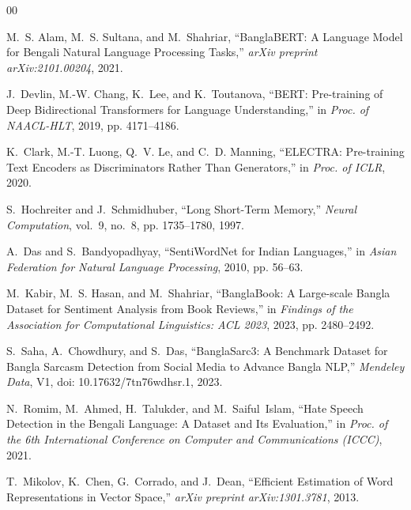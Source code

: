 \documentclass[11pt,a4paper]{article}
\begin{document}
\begin{thebibliography}{00}

M.~S. Alam, M.~S. Sultana, and M.~Shahriar,
``BanglaBERT: A Language Model for Bengali Natural Language Processing Tasks,''
\emph{arXiv preprint arXiv:2101.00204}, 2021.

J.~Devlin, M.-W. Chang, K.~Lee, and K.~Toutanova,
``BERT: Pre-training of Deep Bidirectional Transformers for Language Understanding,''
in \emph{Proc. of NAACL-HLT}, 2019, pp. 4171--4186.

K.~Clark, M.-T. Luong, Q.~V. Le, and C.~D. Manning,
``ELECTRA: Pre-training Text Encoders as Discriminators Rather Than Generators,''
in \emph{Proc. of ICLR}, 2020.

S.~Hochreiter and J.~Schmidhuber,
``Long Short-Term Memory,''
\emph{Neural Computation}, vol.~9, no.~8, pp. 1735--1780, 1997.

A.~Das and S.~Bandyopadhyay,
``SentiWordNet for Indian Languages,''
in \emph{Asian Federation for Natural Language Processing}, 2010, pp. 56--63.

M.~Kabir, M.~S. Hasan, and M.~Shahriar,
``BanglaBook: A Large-scale Bangla Dataset for Sentiment Analysis from Book Reviews,''
in \emph{Findings of the Association for Computational Linguistics: ACL 2023}, 2023, pp. 2480--2492.

S.~Saha, A.~Chowdhury, and S.~Das,
``BanglaSarc3: A Benchmark Dataset for Bangla Sarcasm Detection from Social Media to Advance Bangla NLP,''
\emph{Mendeley Data}, V1, doi: 10.17632/7tn76wdhsr.1, 2023.

N.~Romim, M.~Ahmed, H.~Talukder, and M.~Saiful~Islam,
``Hate Speech Detection in the Bengali Language: A Dataset and Its Evaluation,''
in \emph{Proc. of the 6th International Conference on Computer and Communications (ICCC)}, 2021.

T.~Mikolov, K.~Chen, G.~Corrado, and J.~Dean,
``Efficient Estimation of Word Representations in Vector Space,''
\emph{arXiv preprint arXiv:1301.3781}, 2013.

\end{thebibliography}
\end{document}
